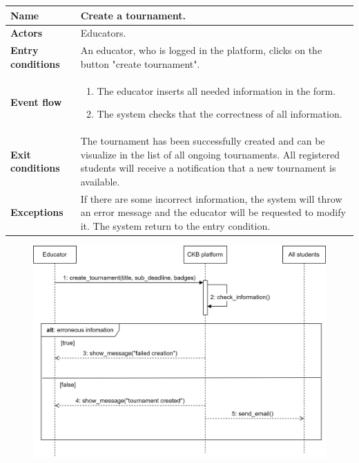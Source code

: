 \begin{enumerate}[label=\textbf{UC.\arabic*}]
\begin{table}[h]
                \begin{tabular}{|m{3.2cm}|m{9.8cm}|}
                    \hline
                    \textbf{Name} & Create a tournament. \\
                    \hline
                    \textbf{Actors} & Educators. \\
                    \hline
                    \textbf{Entry conditions}  & An educator, who is logged in the platform, clicks on the button "create tournament". \\
                    \hline
                    \textbf{Event flow}  &  
                    \begin{enumerate}[label=\arabic*.]
                        \item The educator inserts all needed information in the form.
                        \item The system checks that the correctness of all information.
                    \end{enumerate}\\
                    \hline
                    \textbf{Exit conditions}  & The tournament has been successfully created and can be visualize in the list of all ongoing tournaments. All registered students will receive a notification that a new tournament is available.\\
                    \hline
                    \textbf{Exceptions}  & 
                    If there are some incorrect information, the system will throw an error message and the educator will be requested to modify it. The system return to the entry condition. \\
                    \hline 
                \end{tabular}
        \end{table}
        \begin{figure}[h]
            \centering
            \includegraphics[scale = 0.7]{images/sd/createT.png}

\end{figure}
\end{enumerate}

